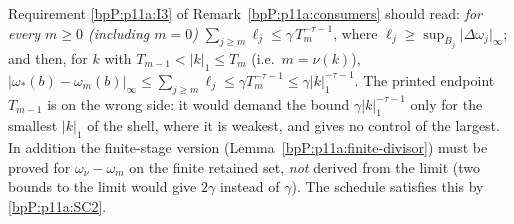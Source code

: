 \begin{remark}\label{bpP:p11a:i3-corrected}
Requirement \ref{bpP:p11a:I3} of Remark~\ref{bpP:p11a:consumers} should read: \emph{for every $m\ge0$ (including $m=0$)} $\sum_{j\ge m}\ell_j\le\gamma\,T_m^{-\tau-1}$, where $\ell_j\ge\sup_{B_j}\lvert\Delta\omega_j\rvert_\infty$; and then, for $k$ with $T_{m-1}<\lvert k\rvert_1\le T_m$ (i.e.\ $m=\nu(k)$), $\lvert\omega_*(b)-\omega_m(b)\rvert_\infty\le\sum_{j\ge m}\ell_j\le\gamma T_m^{-\tau-1}\le\gamma\lvert k\rvert_1^{-\tau-1}$. The printed endpoint $T_{m-1}$ is on the wrong side: it would demand the bound $\gamma\lvert k\rvert_1^{-\tau-1}$ only for the smallest $\lvert k\rvert_1$ of the shell, where it is weakest, and gives no control of the largest. In addition the finite-stage version (Lemma~\ref{bpP:p11a:finite-divisor}) must be proved for $\omega_\nu-\omega_m$ on the finite retained set, \emph{not} derived from the limit (two bounds to the limit would give $2\gamma$ instead of $\gamma$). The schedule satisfies this by \ref{bpP:p11a:SC2}.
\end{remark}


